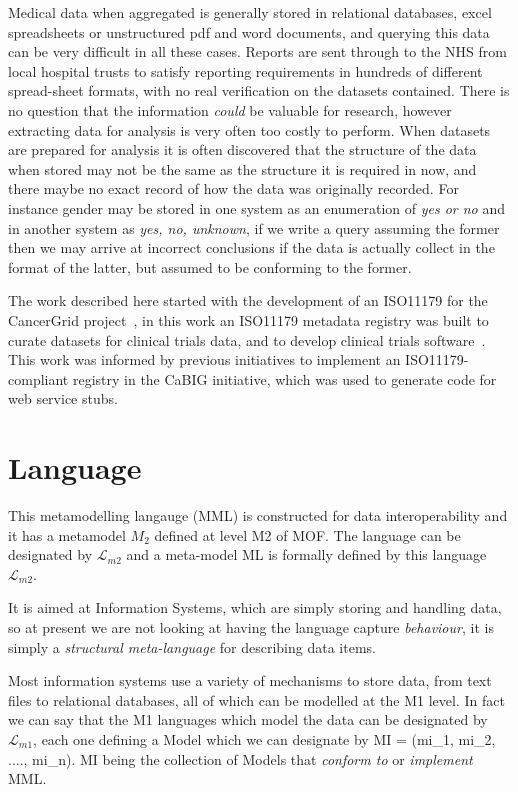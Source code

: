 \documentclass{llncs}
\newcommand{\Lagr}{\mathcal{L}}
\begin{document}
Medical data when aggregated is generally stored in relational databases, excel spreadsheets or unstructured pdf and word documents, and querying this data can be very difficult in all these cases. Reports are sent through to the NHS from local hospital trusts to satisfy reporting requirements in hundreds of different spread-sheet formats, with no real verification on the datasets contained. There is no question that the information \emph{could} be valuable for research, however extracting data for analysis is very often too costly to perform.  When datasets are prepared for analysis it is often discovered that the structure of the data when stored may not be the same as the structure it is required in now, and there maybe no exact record of how the data was originally recorded. For instance gender may be stored in one system as an enumeration of \emph{yes or no} and in another system as \emph{yes, no, unknown}, if we write a query assuming the former then we may arrive at incorrect conclusions if the data is actually collect in the format of the latter, but assumed to be conforming to the former. 

The work described here started with the development of an ISO11179 for the CancerGrid project~\cite{davi14}, in this work an ISO11179 metadata registry was built to curate datasets for clinical trials data, and to develop clinical trials software~\cite{davi12, Abler2011}. This work was informed by previous initiatives to implement an ISO11179-compliant registry in the CaBIG initiative, which was used to generate code for web service stubs.

\section{Language}

This metamodelling langauge (MML) is constructed for data interoperability and it has a metamodel \textbf{$M_2$} defined at level M2 of MOF. The language can be designated by $\Lagr_{m2}$ and a meta-model ML is formally defined by this language $\Lagr_{m2}$.

It is aimed at Information Systems, which are simply storing and handling data, so at present we are not looking at having the language capture \emph{behaviour}, it is simply a \emph{structural meta-language} for describing data items. 

Most information systems use a variety of mechanisms to store data, from text files to relational databases, all of which can be modelled at the M1 level.  In fact we can say that the M1 languages which model the data can be designated by $\Lagr_{m1}$, each one defining a Model which we can designate by MI = (mi\_1, mi\_2, ...., mi\_n).  MI being the collection of Models that \emph{conform to} or \emph{implement} MML.  
\end{document}
